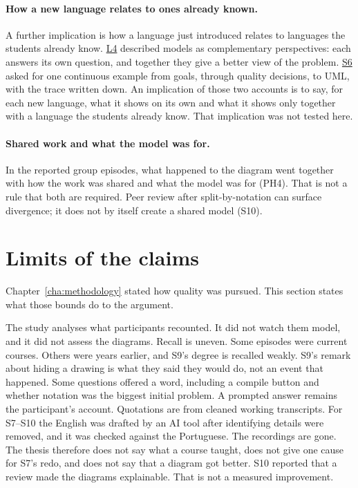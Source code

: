 \paragraph{How a new language relates to ones already known.}
A further implication is how a language just introduced relates to languages the students already know. \hyperref[app:l4t067]{L4} described models as complementary perspectives: each answers its own question, and together they give a better view of the problem. \hyperref[app:s6c14]{S6} asked for one continuous example from goals, through quality decisions, to UML, with the trace written down. An implication of those two accounts is to say, for each new language, what it shows on its own and what it shows only together with a language the students already know. That implication was not tested here.

\paragraph{Shared work and what the model was for.}
In the reported group episodes, what happened to the diagram went together with how the work was shared and what the model was for (PH4). That is not a rule that both are required. Peer review after split-by-notation can surface divergence; it does not by itself create a shared model (S10).

\section{Limits of the claims}
\label{sec:disc_limits}

Chapter~\ref{cha:methodology} stated how quality was pursued. This section states what those bounds do to the argument.

The study analyses what participants recounted. It did not watch them model, and it did not assess the diagrams. Recall is uneven. Some episodes were current courses. Others were years earlier, and S9's degree is recalled weakly. S9's remark about hiding a drawing is what they said they would do, not an event that happened. Some questions offered a word, including a compile button and whether notation was the biggest initial problem. A prompted answer remains the participant's account. Quotations are from cleaned working transcripts. For S7--S10 the English was drafted by an AI tool after identifying details were removed, and it was checked against the Portuguese. The recordings are gone. The thesis therefore does not say what a course taught, does not give one cause for S7's redo, and does not say that a diagram got better. S10 reported that a review made the diagrams explainable. That is not a measured improvement.

